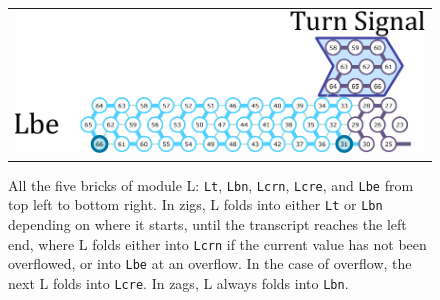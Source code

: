 \documentclass[runningheads]{llncs}
\begin{document}
\begin{figure}[tb]
\begin{tabular}{c}
  \begin{minipage}{0.5\linewidth}
  \centering
   \includegraphics[width=0.9\linewidth]{fig/svg/Lbe_3.pdf}
   \vspace*{18mm}

 \end{minipage}
 \end{tabular}
 \caption{All the five bricks of module L: \texttt{Lt}, \texttt{Lbn}, \texttt{Lcrn}, \texttt{Lcre}, and \texttt{Lbe} from top left to bottom right.
In zigs, L folds into either \texttt{Lt} or \texttt{Lbn} depending on where it starts, until the transcript reaches the left end, where L folds either into \texttt{Lcrn} if the current value has not been overflowed, or into \texttt{Lbe} at an overflow.
In the case of overflow, the next L folds into \texttt{Lcre}.
In zags, L always folds into \texttt{Lbn}.}
 \label{fig:leftturns}
\end{figure}
\end{document}
